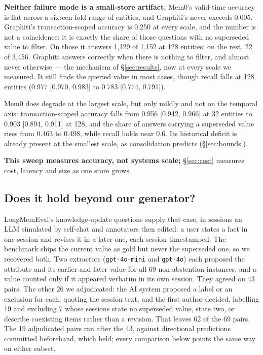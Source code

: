 \documentclass[conference]{IEEEtran}
\begin{document}
\textbf{Neither failure mode is a small-store artifact.} Mem0's valid-time
accuracy is flat across a sixteen-fold range of entities, and Graphiti's never
exceeds 0.005. Graphiti's transaction-scoped accuracy is 0.250 at every scale,
and the number is not a coincidence: it is exactly the share of those questions
with no superseded value to filter. On those it answers 1{,}129 of 1{,}152 at
128 entities; on the rest, 22 of 3{,}456. Graphiti answers correctly when there
is nothing to filter, and almost never otherwise --- the mechanism of
\S\ref{sec:results}, now at every scale we measured. It still finds the
queried value in most cases, though recall falls at 128 entities
(0.977 [0.970, 0.983] to 0.783 [0.774, 0.791]).

Mem0 does degrade at the largest scale, but only mildly and not on the
temporal axis: transaction-scoped accuracy falls from 0.956 [0.942, 0.966] at
32 entities to 0.903 [0.894, 0.911] at 128, and the share of answers carrying a
superseded value rises from 0.463 to 0.498, while recall holds near 0.6. Its
historical deficit is already present at the smallest scale, as consolidation
predicts (\S\ref{sec:bounds}).

\textbf{This sweep measures accuracy, not systems scale;} \S\ref{sec:cost}
measures cost, latency and size as one store grows.

\subsection{Does it hold beyond our generator?}\label{sec:realdata}

LongMemEval's knowledge-update questions
\citep{longmemeval} supply that case, in sessions an LLM simulated by self-chat
and annotators then edited: a user states a fact in one session and
revises it in a later one, each session timestamped. The benchmark ships the
current value as gold but never the superseded one, so we recovered both. Two
extractors (\texttt{gpt-4o-mini} and \texttt{gpt-4o}) each proposed the
attribute and its earlier and later value for all 69 non-abstention instances,
and a value counted only if it appeared verbatim in its own session. They
agreed on 43 pairs. The other 26 we adjudicated: the AI system proposed a label
or an exclusion for each, quoting the session text, and the first author decided,
labelling 19 and excluding 7 whose sessions state no superseded value, state
two, or describe coexisting items rather than a revision. That leaves 62 of the
69 pairs. The 19 adjudicated pairs ran after the 43, against directional
predictions committed beforehand, which held; every comparison below points
the same way on either subset.
\end{document}
